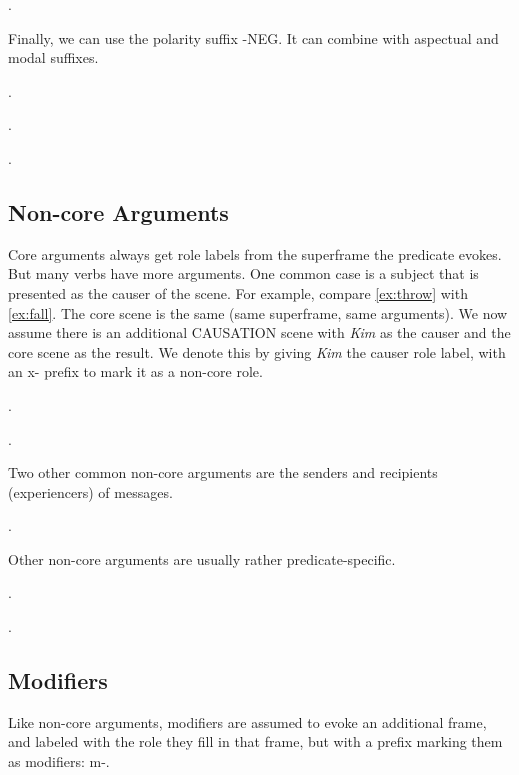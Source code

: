 \documentclass[a4paper]{article}
\newcommand{\fr}[1]{\textsf{#1}}
\newcommand{\frs}[1]{\mbox{\textsf{#1}}} %
\newcommand{\rl}[1]{\textsf{#1}}
\begin{document}
\ex.

Finally, we can use the polarity suffix \frs{-NEG}. It can combine with aspectual and modal suffixes.

\ex.

\ex.

\ex.

\newpage\subsection{Non-core Arguments}

Core arguments always get role labels from the superframe the predicate evokes.
But many verbs have more arguments. One common case is a subject that is
presented as the causer of the scene. For example, compare \ref{ex:throw} with
\ref{ex:fall}. The core scene is the same (same superframe, same arguments). We
now assume there is an additional \fr{CAUSATION} scene with \emph{Kim} as the
\rl{causer} and the core scene as the \rl{result}. We denote this by giving
\emph{Kim} the \rl{causer} role label, with an \rl{x-} prefix to mark it as a
non-core role.

\ex.\label{ex:throw}

\ex.

Two other common non-core arguments are the senders and recipients (experiencers) of messages.

\ex.

Other non-core arguments are usually rather predicate-specific.

\ex.

\ex.

\newpage\subsection{Modifiers}

Like non-core arguments, modifiers are assumed to evoke an additional frame,
and labeled with the role they fill in that frame, but with a prefix marking
them as modifiers: \rl{m-}.
\end{document}
